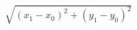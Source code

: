 \documentclass [convert={density=288,outext=.png}]{standalone}
\begin{document}
$
\sqrt {(x_{1}-x_{0})^{2}+(y_{1}-y_{0})^{2}}
$
\end{document}
